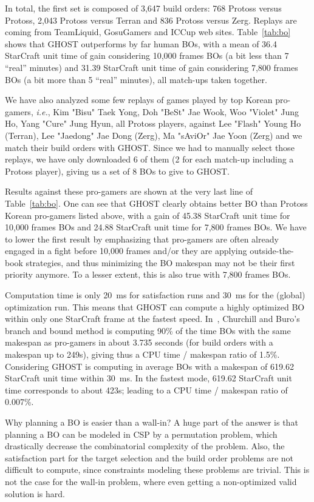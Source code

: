 \documentclass[journal]{IEEEtran}
\newcommand{\csp}{\textsc{CSP}\xspace}
\newcommand{\ghost}{\textsc{GHOST}\xspace}
\newcommand{\ie}{\textit{i.e.}}
\begin{document}
In total, the first set is  composed of 3,647 build orders: 768 Protoss
versus  Protoss, 2,043  Protoss versus  Terran and  836 Protoss  versus
Zerg.   Replays are  coming from  TeamLiquid,
GosuGamers and  ICCup web sites.  Table~\ref{tab:bo}  shows that \ghost
outperforms by far human BOs, with  a mean of 36.4 StarCraft unit time
of gain considering 10,000 frames BOs (a bit less than 7 ``real'' minutes) and 31.39 StarCraft unit time of
gain considering 7,800 frames BOs (a bit more than 5 ``real'' minutes), all match-ups taken together.

We have also  analyzed some few replays of games  played by top Korean
pro-gamers,  \ie, Kim  "Bisu"  Taek  Yong, Doh  "BeSt"  Jae Wook,  Woo
"Violet" Jung Ho, Yang "Cure"  Jung Hyun, all Protoss players, against
Lee  "Flash" Young  Ho (Terran),  Lee  "Jaedong" Jae  Dong (Zerg),  Ma
"sAviOr" Jae Yoon (Zerg) and we  match their build orders with \ghost.
Since we had to manually select those replays, we have only downloaded
6 of them (2 for each  match-up including a Protoss player), giving us
a set of 8 BOs to give to \ghost.

Results against  these pro-gamers are shown  at the very last  line of
Table~\ref{tab:bo}.  One can see that \ghost clearly obtains better BO
than  Protoss Korean  pro-gamers listed  above, with  a gain  of 45.38
StarCraft unit  time for  10,000 frames BOs  and 24.88  StarCraft unit
time  for 7,800  frames BOs.  We  have to  lower the  first result  by
emphasizing that pro-gamers are often  already engaged in a fight before
10,000 frames and/or they are applying outside-the-book strategies, and thus
minimizing the BO makespan may not be their first priority anymore. To
a lesser extent, this is also true with 7,800 frames BOs.

Computation time is  only 20~ms for satisfaction runs and  30~ms for the
(global) optimization run. This means that \ghost can compute a highly
optimized BO  within only one StarCraft frame  at the fastest
speed. In~\cite{ChurchillB11},  Churchill and Buro's branch  and bound
method  is computing  90\%  of the  time BOs  with the  same
makespan as pro-gamers in about 3.735 seconds (for build orders with a
makespan  up to  249s), giving  thus a  CPU time  / makespan  ratio of
1.5\%. Considering \ghost is computing  in average BOs with a
makespan of  619.62 StarCraft  unit time within  30~ms. In  the fastest
mode, 619.62 StarCraft unit time corresponds to about 423s; leading to
a CPU time / makespan ratio of 0.007\%.

Why planning a BO is easier  than a wall-in? A huge part of the
answer is  that planning  a BO can be modeled  in \csp  by a
permutation  problem,  which  drastically decrease  the  combinatorial
complexity of the problem. Also,  the satisfaction part for the target
selection and the  build order problems are not  difficult to compute,
since constraints  modeling these problems  are trivial.  This  is not
the case for  the wall-in problem, where even  getting a non-optimized
valid solution is hard.
\end{document}
